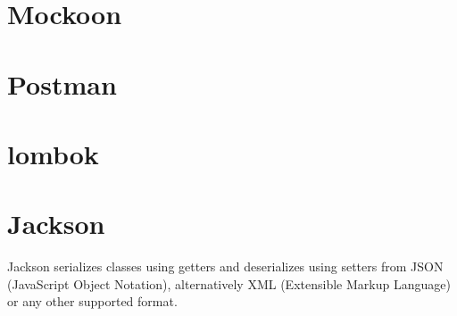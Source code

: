 \section{Mockoon} \label{sec:mockoon}

\section{Postman} \label{sec:postman}

\section{lombok} \label{sec:lombok}

\section{Jackson} \label{sec:jackson}
Jackson serializes classes using getters and deserializes using setters from JSON (JavaScript Object Notation), alternatively XML (Extensible Markup Language) or any other supported format.
